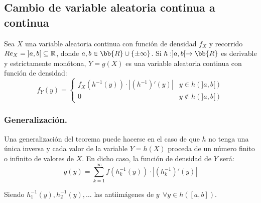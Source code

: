 \subsection{Cambio de variable aleatoria continua a continua}
\label{subsec:CV_Continua}

\begin{coro}
    Sea $X$ una variable aleatoria continua con función de densidad $f_X$ y recorrido $Re_X=\left]a,b\right[\subseteq \mathbb R$, donde $a,b\in \bb{R}\cup \{\pm \infty\}$.
    Si $h:]a,b[\to \bb{R}$ es derivable y estrictamente monótona, $Y=g(X)$ es una variable aleatoria continua con función de densidad:
    \begin{equation*}
        f_Y(y)=\begin{cases}
            f_X(h^{-1}(y))\cdot |(h^{-1})'(y)| & y \in h(]a,b[)\\
            0 & y \notin h(]a,b[)
        \end{cases}
    \end{equation*}
\end{coro}
\subsubsection{Generalización.}
Una generalización del teorema puede hacerse en el caso de que $h$ no tenga una única inversa y cada valor de la variable $Y=h(X)$ proceda de un número finito o infinito de valores de $X$. En dicho caso, la función de densidad de $Y$ será:
$$g(y) = \sum_{k=1}^{\infty} f(h^{-1}_k(y)) \cdot |(h^{-1}_k)'(y)|$$

Siendo $h_1^{-1}(y),h_2^{-1}(y), \ldots$ las antiimágenes de $y~~\forall y \in h([a,b])$.

